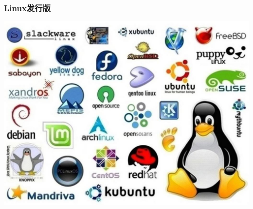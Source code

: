 \documentclass[xcolor=svgnames,presentation]{beamer}
\begin{document}
\begin{frame}
\frametitle{Linux发行版}
\label{sec-2-3-7}

\begin{center}
\includegraphics[width=.9\linewidth]{img/distri.jpg}
\end{center}
\end{frame}
\end{document}
